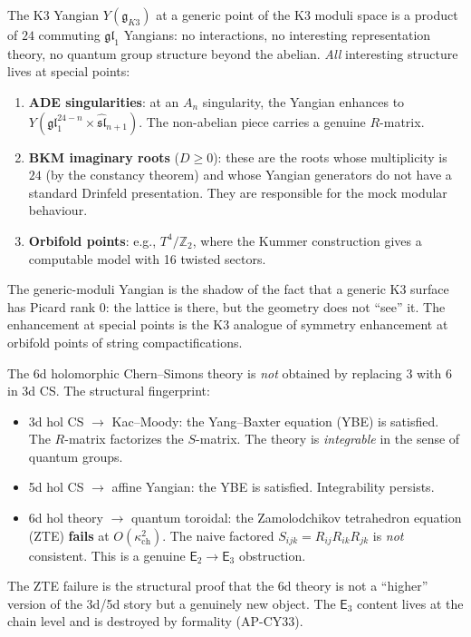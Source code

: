 \documentclass[11pt]{article}
\newcommand{\fg}{\mathfrak{g}}
\newcommand{\fsl}{\mathfrak{sl}}
\newcommand{\fgl}{\mathfrak{gl}}
\newcommand{\Z}{\mathbb{Z}}
\newcommand{\Etwo}{\mathsf{E}_2}
\begin{document}
\begin{remark}
\label{rem:k3-boring-generic}
The K3 Yangian $Y(\fg_{K3})$ at a generic point of the K3 moduli
space is a product of $24$ commuting $\fgl_1$ Yangians: no interactions,
no interesting representation theory, no quantum group structure beyond
the abelian. \emph{All} interesting structure lives at special points:
\begin{enumerate}[label=\textup{(\roman*)}]
 \item \textbf{ADE singularities}: at an $A_n$ singularity, the
 Yangian enhances to $Y(\fgl_1^{24-n} \times \widehat{\fsl}_{n+1})$.
 The non-abelian piece carries a genuine $R$-matrix.
 \item \textbf{BKM imaginary roots} ($D \geq 0$): these are the
 roots whose multiplicity is $24$ (by the constancy theorem) and
 whose Yangian generators do not have a standard Drinfeld
 presentation. They are responsible for the mock modular behaviour.
 \item \textbf{Orbifold points}: e.g., $T^4/\Z_2$, where the
 Kummer construction gives a computable model with 16 twisted sectors.
\end{enumerate}
The generic-moduli Yangian is the shadow of the fact that a generic
K3 surface has Picard rank 0: the lattice is there, but the geometry
does not ``see'' it. The enhancement at special points is the K3
analogue of symmetry enhancement at orbifold points of string compactifications.
\end{remark}

\begin{remark}
\label{rem:6d-not-upgrade}
The 6d holomorphic Chern--Simons theory is \emph{not} obtained by
replacing $3$ with $6$ in 3d CS. The structural fingerprint:
\begin{itemize}
 \item 3d hol CS $\to$ Kac--Moody: the Yang--Baxter equation (YBE)
 is satisfied. The $R$-matrix factorizes the $S$-matrix. The
 theory is \emph{integrable} in the sense of quantum groups.
 \item 5d hol CS $\to$ affine Yangian: the YBE is satisfied.
 Integrability persists.
 \item 6d hol theory $\to$ quantum toroidal: the Zamolodchikov
 tetrahedron equation (ZTE) \textbf{fails} at $O(\kappa_{\mathrm{ch}}^2)$. The
 naive factored $S_{ijk} = R_{ij} R_{ik} R_{jk}$ is \emph{not}
 consistent. This is a genuine $\Etwo \to \mathsf{E}_3$ obstruction.
\end{itemize}
The ZTE failure is the structural proof that the 6d theory is not
a ``higher'' version of the 3d/5d story but a genuinely new object.
The $\mathsf{E}_3$ content lives at the chain level and is destroyed
by formality (AP-CY33).
\end{remark}
\end{document}
